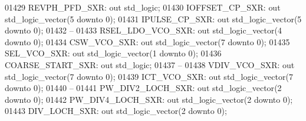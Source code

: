 \begin{DoxyCode}
01429         REVPH\_PFD\_SXR:  \textcolor{keywordflow}{out} \textcolor{comment}{std\_logic};
01430         IOFFSET\_CP\_SXR: \textcolor{keywordflow}{out} \textcolor{comment}{std\_logic\_vector}(\textcolor{vhdllogic}{}\textcolor{vhdllogic}{5} \textcolor{keywordflow}{downto} \textcolor{vhdllogic}{}\textcolor{vhdllogic}{0});
01431         IPULSE\_CP\_SXR:  \textcolor{keywordflow}{out} \textcolor{comment}{std\_logic\_vector}(\textcolor{vhdllogic}{}\textcolor{vhdllogic}{5} \textcolor{keywordflow}{downto} \textcolor{vhdllogic}{}\textcolor{vhdllogic}{0});
01432 \textcolor{keyword}{        --}
01433         RSEL\_LDO\_VCO\_SXR:   \textcolor{keywordflow}{out} \textcolor{comment}{std\_logic\_vector}(\textcolor{vhdllogic}{}\textcolor{vhdllogic}{4} \textcolor{keywordflow}{downto} \textcolor{vhdllogic}{}\textcolor{vhdllogic}{0});
01434         CSW\_VCO\_SXR:    \textcolor{keywordflow}{out} \textcolor{comment}{std\_logic\_vector}(\textcolor{vhdllogic}{}\textcolor{vhdllogic}{7} \textcolor{keywordflow}{downto} \textcolor{vhdllogic}{}\textcolor{vhdllogic}{0});
01435         SEL\_VCO\_SXR:    \textcolor{keywordflow}{out} \textcolor{comment}{std\_logic\_vector}(\textcolor{vhdllogic}{}\textcolor{vhdllogic}{1} \textcolor{keywordflow}{downto} \textcolor{vhdllogic}{}\textcolor{vhdllogic}{0});
01436         COARSE\_START\_SXR:   \textcolor{keywordflow}{out} \textcolor{comment}{std\_logic};
01437 \textcolor{keyword}{        --}
01438         VDIV\_VCO\_SXR:   \textcolor{keywordflow}{out} \textcolor{comment}{std\_logic\_vector}(\textcolor{vhdllogic}{}\textcolor{vhdllogic}{7} \textcolor{keywordflow}{downto} \textcolor{vhdllogic}{}\textcolor{vhdllogic}{0});
01439         ICT\_VCO\_SXR:    \textcolor{keywordflow}{out} \textcolor{comment}{std\_logic\_vector}(\textcolor{vhdllogic}{}\textcolor{vhdllogic}{7} \textcolor{keywordflow}{downto} \textcolor{vhdllogic}{}\textcolor{vhdllogic}{0});
01440 \textcolor{keyword}{        --}
01441         PW\_DIV2\_LOCH\_SXR:   \textcolor{keywordflow}{out} \textcolor{comment}{std\_logic\_vector}(\textcolor{vhdllogic}{}\textcolor{vhdllogic}{2} \textcolor{keywordflow}{downto} \textcolor{vhdllogic}{}\textcolor{vhdllogic}{0});
01442         PW\_DIV4\_LOCH\_SXR:   \textcolor{keywordflow}{out} \textcolor{comment}{std\_logic\_vector}(\textcolor{vhdllogic}{}\textcolor{vhdllogic}{2} \textcolor{keywordflow}{downto} \textcolor{vhdllogic}{}\textcolor{vhdllogic}{0});
01443         DIV\_LOCH\_SXR:   \textcolor{keywordflow}{out} \textcolor{comment}{std\_logic\_vector}(\textcolor{vhdllogic}{}\textcolor{vhdllogic}{2} \textcolor{keywordflow}{downto} \textcolor{vhdllogic}{}\textcolor{vhdllogic}{0});

\end{DoxyCode}
